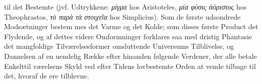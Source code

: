 \documentclass[12pt,a4paper]{book}
\newcommand{\gk}[1]{\textit{#1}}
\begin{document}
til det Bestemte (jvf. Udtrykkene: \gk{μίγμα} hos Aristoteles, \gk{μία
φύσις ἀόριστος} hos Theophrastos, \gk{τὸ παρὰ τὰ στοιχεῖα} hos
Simplicius). Som de første udsondrede Modsætninger bestem\-%
mes det Varme og det Kolde; som disses første Product det
Flydende, og af dettes videre Omformninger forklares saa med
dristig Phantasie det mangfoldige Tilværelsesformer omsluttende
Universums Tilblivelse, og Dannelsen af en uendelig Række
efter hinanden følgende Verdener, der alle betale Enkelttil\-%
værelsens Skyld ved efter Tidens lovbestemte Orden at vende
tilbage til det, hvoraf de ere tilblevne.
\end{document}
